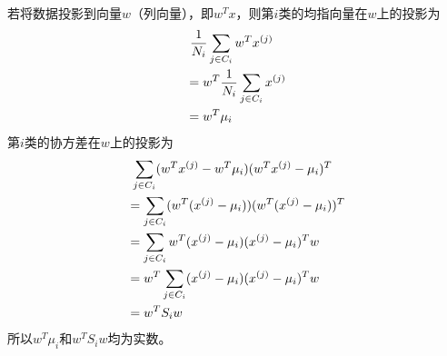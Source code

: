 若将数据投影到向量$w$（列向量），即$w^Tx$，则第$i$类的均指向量在$w$上的投影为
\begin{eqnarray}
\begin{aligned}
&\ \frac{1}{N_i}\sum_{j\in C_i}w^T{x}^{({j})}\\
&=w^T\frac{1}{N_i}\sum_{j\in C_i}{x}^{({j})}\\
&=w^T\mu_i
\end{aligned}
\end{eqnarray}
第$i$类的协方差在$w$上的投影为
\begin{eqnarray}
\begin{aligned}
&\ \sum_{j\in C_i}(w^T{x}^{({j})}-w^T\mu_i)(w^T{x}^{({j})}-\mu_i)^T\\
&=\sum_{j\in C_i}(w^T({x}^{({j})}-\mu_i))(w^T({x}^{({j})}-\mu_i))^T\\
&=\sum_{j\in C_i}w^T({x}^{({j})}-\mu_i)({x}^{({j})}-\mu_i)^Tw\\
&=w^T\sum_{j\in C_i}({x}^{({j})}-\mu_i)({x}^{({j})}-\mu_i)^Tw\\
&=w^TS_iw
\end{aligned}
\end{eqnarray}
所以$w^T\mu_i$和$w^TS_iw$均为实数。

